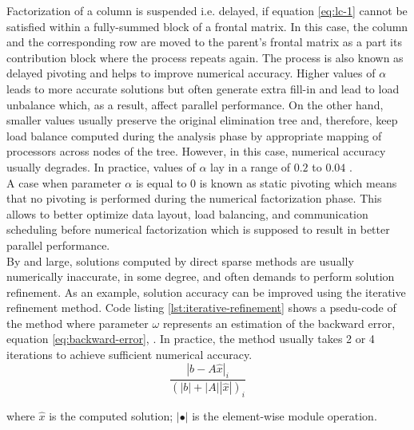 Factorization of a column is suspended i.e. delayed, if equation \ref{eq:lc-1} cannot be satisfied within a fully-summed block of a frontal matrix. In this case, the column and the corresponding row are moved to the parent's frontal matrix as a part its contribution block where the process repeats again. The process is also known as delayed pivoting and helps to improve numerical accuracy. Higher values of $\alpha$ leads to more accurate solutions but often generate extra fill-in and lead to load unbalance which, as a result, affect parallel performance. On the other hand, smaller values usually preserve the original elimination tree and, therefore,  keep load balance computed during the analysis phase by appropriate mapping of processors across nodes of the tree. However, in this case, numerical accuracy usually degrades. In practice, values of $\alpha$ lay in a range of $0.2$ to $0.04$ .\\



A case when parameter $\alpha$ is equal to $0$ is known as static pivoting which means that no pivoting is performed during the numerical factorization phase. This allows to better optimize data layout, load balancing, and communication scheduling \cite{superlu-manual} before numerical factorization which is supposed to result in better parallel performance.\\



By and large, solutions computed by direct sparse methods are usually numerically inaccurate, in some degree, and often demands to perform solution refinement. As an example, solution accuracy can be improved using the iterative refinement method. Code listing \ref{lst:iterative-refinement} shows a psedu-code of the method where parameter $\omega$ represents an estimation of the backward error, equation \ref{eq:backward-error}, \cite{mm-backward-error}. In practice, the method usually takes 2 or 4 iterations to achieve sufficient numerical accuracy.\\

\begin{equation} \label{eq:backward-error}
\frac{|b - A\hat{x}|_{i}}{(|b| + |A| |\hat{x}|)_{i}}
\end{equation}

where $\hat{x}$ is the computed solution; $|\bullet|$ is the element-wise module operation.\\


